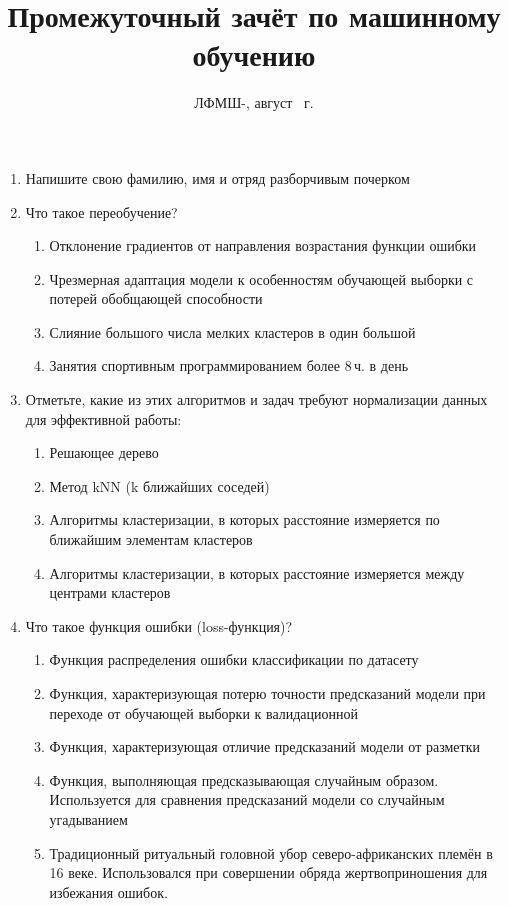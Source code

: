 \documentclass[a4paper,10pt]{article}
\title{Промежуточный зачёт по машинному обучению}
\date{ЛФМШ-\arabic{LFMSHnumber}, август {\the \year}~г.}
\begin{document}
\maketitle
\begin{enumerate}
	\item Напишите свою фамилию, имя и отряд разборчивым почерком
	\vspace{1cm}
	\item Что такое переобучение?
	\begin{enumerate}
		\item Отклонение градиентов от направления возрастания функции ошибки
		\item Чрезмерная адаптация модели к особенностям обучающей выборки с потерей обобщающей способности
		\item Слияние большого числа мелких кластеров в один большой
		\item Занятия спортивным программированием более 8\,ч. в день
	\end{enumerate}

	\item Отметьте, какие из этих алгоритмов и задач требуют нормализации данных для эффективной работы:
	\begin{enumerate}
		\item Решающее дерево
		\item Метод kNN (k ближайших соседей)
		\item Алгоритмы кластеризации, в которых расстояние измеряется по ближайшим элементам кластеров
		\item Алгоритмы кластеризации, в которых расстояние измеряется между центрами кластеров
	\end{enumerate}
	
	\item Что такое функция ошибки (loss-функция)?
	\begin{enumerate}
		\item Функция распределения ошибки классификации по датасету
		\item Функция, характеризующая потерю точности предсказаний модели при переходе от обучающей выборки к валидационной
		\item Функция, характеризующая отличие предсказаний модели от разметки
		\item Функция, выполняющая предсказывающая случайным образом. Используется для сравнения предсказаний модели со случайным угадыванием
		\item Традиционный ритуальный головной убор северо-африканских племён в 16 веке. Использовался при совершении обряда жертвоприношения для избежания ошибок.
	\end{enumerate} 
		

\end{enumerate}
\end{document}

